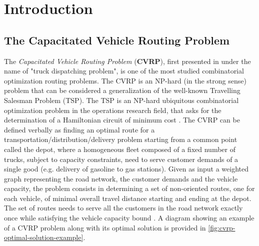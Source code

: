 \chapter{Introduction}
\label{sec:introduction-chapter}

\section{The Capacitated Vehicle Routing Problem}
\label{sec:intro-cvrp-problem}
The \textit{Capacitated Vehicle Routing Problem} (\textbf{CVRP}), first presented in \textcite{dantzig1959}
under the name of "truck dispatching problem",
is one of the most studied combinatorial optimization routing problems.
The CVRP is an NP-hard (in the strong sense) problem
that can be considered a generalization of the well-known Travelling Salesman Problem (TSP).
The TSP \parencite{flood1956}
is an NP-hard \parencite{garey1976planar} ubiquitous combinatorial optimization problem in the operations research field,
that asks for the determination of a Hamiltonian circuit of minimum cost
\parencite{croes1958, laporte1992,johnson1997,applegate2006,gutin2006,hoffman2013}.
The CVRP can be defined verbally as finding an optimal route for a transportation/distribution/delivery problem
starting from a common point called the depot,
where a homogeneous fleet composed of a fixed number of trucks, subject to capacity constraints,
need to serve customer demands of a single good (e.g. delivery of gasoline to gas stations).
Given as input a weighted graph representing the road network,
the customer demands and the vehicle capacity,
the problem consists in determining a set of non-oriented routes, one for each vehicle,
of minimal overall travel distance starting and ending at the depot.
The set of routes needs to serve all the customers in the road network exactly once
while satisfying the vehicle capacity bound \parencite{toth2014}.
A diagram showing an example of a CVRP problem along with its optimal solution
is provided in \cref{fig:cvrp-optimal-solution-example}.

